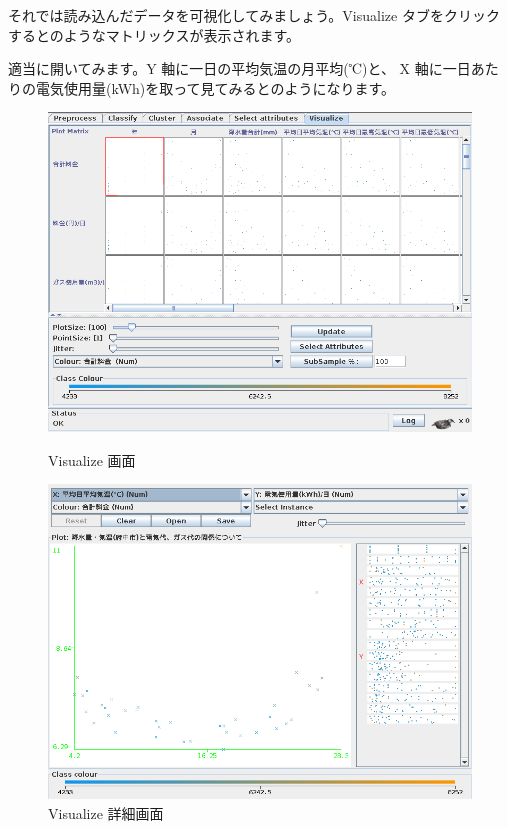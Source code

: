 \documentclass[mingoth,a4paper]{jsarticle}
\begin{document}
それでは読み込んだデータを可視化してみましょう。Visualize タブをクリック
するとのようなマトリックスが表示されます。

適当に開いてみます。Y 軸に一日の平均気温の月平均(℃)と、 X 軸に一日あた
りの電気使用量(kWh)を取って見てみるとのようになります。

\begin{figure}[H]
 \begin{minipage}{0.5\hsize}
\begin{center}
\includegraphics[width=1\hsize]{image201003/weka4.png}
\caption{Visualize 画面}
\label{fig:wekavisualize}
\end{center}
\end{minipage}
\begin{minipage}{0.5\hsize}
 \begin{center}
 \includegraphics[width=1\hsize]{image201003/weka5.png}
 \caption{Visualize 詳細画面}
\label{fig:wekavisualizedetail}
 \end{center}
\end{minipage}
\end{figure}
\end{document}
